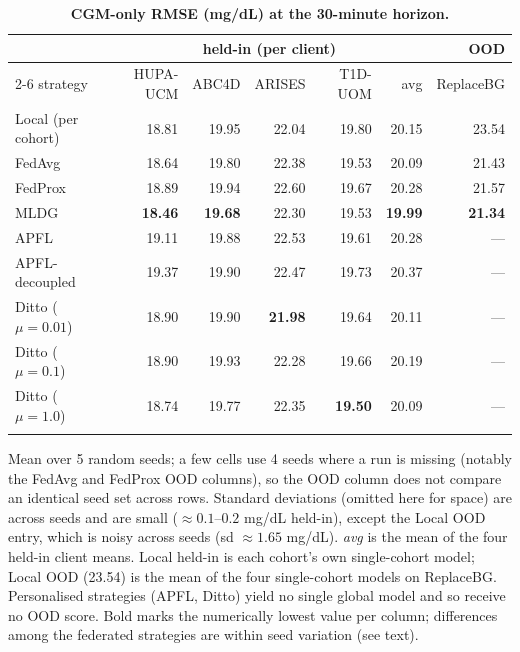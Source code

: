 \documentclass[10pt,letterpaper]{article}
\newlength\savedwidth
\newcommand\thickhline{\noalign{\global\savedwidth\arrayrulewidth\global\arrayrulewidth 2pt}%
\hline
\noalign{\global\arrayrulewidth\savedwidth}}
\begin{document}
\begin{table}[!ht]
\centering
\captionsetup{justification=centering,singlelinecheck=on}
\caption{\bf CGM-only RMSE (mg/dL) at the 30-minute horizon.}
\label{tab:main}
\begin{tabular}{lrrrrrr}
\thickhline
 & \multicolumn{5}{c}{held-in (per client)} & OOD \\
\cline{2-6}
strategy & HUPA-UCM & ABC4D & ARISES & T1D-UOM & avg & ReplaceBG \\
\hline
Local (per cohort) & 18.81 & 19.95 & 22.04 & 19.80 & 20.15 & 23.54 \\
\hline
FedAvg  & 18.64 & 19.80 & 22.38 & 19.53 & 20.09 & 21.43 \\
FedProx & 18.89 & 19.94 & 22.60 & 19.67 & 20.28 & 21.57 \\
MLDG    & \textbf{18.46} & \textbf{19.68} & 22.30 & 19.53 & \textbf{19.99} & \textbf{21.34} \\
\hline
APFL          & 19.11 & 19.88 & 22.53 & 19.61 & 20.28 & --- \\
APFL-decoupled & 19.37 & 19.90 & 22.47 & 19.73 & 20.37 & --- \\
Ditto ($\mu{=}0.01$) & 18.90 & 19.90 & \textbf{21.98} & 19.64 & 20.11 & --- \\
Ditto ($\mu{=}0.1$)  & 18.90 & 19.93 & 22.28 & 19.66 & 20.19 & --- \\
Ditto ($\mu{=}1.0$)  & 18.74 & 19.77 & 22.35 & \textbf{19.50} & 20.09 & --- \\
\thickhline
\end{tabular}
\begin{center}
{\small Mean over 5 random seeds; a few cells use 4 seeds where a run is missing
(notably the FedAvg and FedProx OOD columns), so the OOD column does not compare
an identical seed set across rows. Standard deviations (omitted here for space)
are across seeds and are small ($\approx 0.1$--$0.2$ mg/dL held-in), except the
Local OOD entry, which is noisy across seeds (sd $\approx 1.65$ mg/dL). \emph{avg}
is the mean of the four held-in client means. Local held-in is each cohort's own
single-cohort model; Local OOD (23.54) is the mean of the four single-cohort
models on ReplaceBG. Personalised strategies (APFL, Ditto) yield no single
global model and so receive no OOD score. Bold marks the numerically lowest value
per column; differences among the federated strategies are within seed variation
(see text).}
\end{center}
\end{table}
\end{document}
